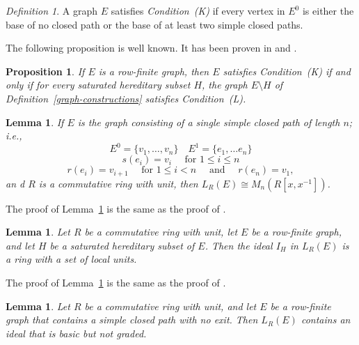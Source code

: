 \documentclass[11pt]{amsart}
\newtheorem{lemma}[theorem]{Lemma}
\newtheorem{proposition}[theorem]{Proposition}
\theoremstyle{remark}
\newtheorem{definition}[theorem]{Definition}
\numberwithin{equation}{section}
\begin{document}
\begin{definition}
A graph $E$ satisfies \emph{Condition~(K)} if every vertex in $E^0$ is either the base of no closed path or the base of at least two simple closed paths.
\end{definition}

The following proposition is well known.  It has been proven in \cite[Proposition~1.17]{Tom9} and \cite[Theorem~4.5(2),(3)]{PinParMol}.

\begin{proposition} \label{K-implies-quotient-L}
If $E$ is a row-finite graph, then $E$ satisfies Condition~(K) if and only if for every saturated hereditary subset $H$, the graph $E \setminus H$ of Definition~\ref{graph-constructions} satisfies Condition~(L).
\end{proposition}


\begin{lemma} \label{closed-path-M-Kx}
If $E$ is the graph consisting of a single simple closed path of length $n$; i.e., 
$$
E^0 = \{v_1, \ldots, v_n\} \quad E^1 = \{e_1, \ldots e_n \} $$ 
$$s(e_i) = v_i \quad \text{ for $1 \leq i \leq n$}$$ 
$$r(e_i) = v_{i+1} \quad \text{ for $1 \leq i < n$} \quad \text{ and } \quad r(e_n) = v_1,$$ an d $R$ is a commutative ring with unit, then $L_R(E) \cong M_n(R[x,x^{-1}])$.
\end{lemma}

The proof of Lemma~\ref{closed-path-M-Kx} is the same as the proof of \cite[Lemma~6.12]{Tom10}.

\begin{lemma} \label{ideals-tran-lem}
Let $R$ be a commutative ring with unit, let $E$ be a row-finite graph, and let $H$ be a saturated hereditary subset of $E$.  Then the ideal $I_H$ in $L_R(E)$ is a ring with a set of local units.
\end{lemma}

The proof of Lemma~\ref{ideals-tran-lem} is the same as the proof of \cite[Lemma~6.14]{Tom10}.


\begin{lemma} \label{not-L-non-graded-ideals}
Let $R$ be a commutative ring with unit, and let $E$ be a row-finite graph that contains a simple closed path with no exit.  Then $L_R(E)$ contains an ideal that is basic but not graded.  
\end{lemma}
\end{document}
